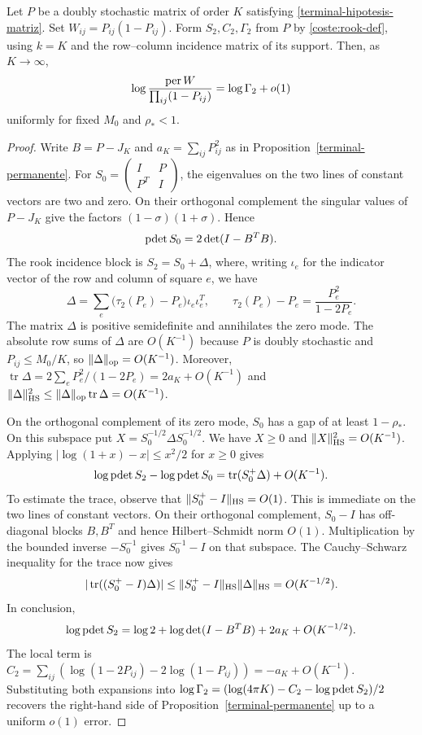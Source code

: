 \begin{lema}\label{terminal-normalizador}
Let $P$ be a doubly stochastic matrix of order $K$ satisfying \eqref{terminal-hipotesis-matriz}.
Set $W_{ij}=P_{ij}(1-P_{ij})$. Form $S_2,C_2,\Gamma_2$ from $P$ by \eqref{coste:rook-def},
using $k=K$ and the row--column incidence matrix of its support. Then, as $K\to\infty$,
\[
 \log\frac{\operatorname{per} W}{\prod_{ij}(1-P_{ij})}=\log\Gamma_2+o(1)
\]
uniformly for fixed $M_0$ and $\rho_*<1$.
\end{lema}
\begin{proof}
Write $B=P-J_K$ and $a_K=\sum_{ij}P_{ij}^2$ as in Proposition~\ref{terminal-permanente}.
For $S_0=\left(\begin{smallmatrix}I&P\\P^T&I\end{smallmatrix}\right)$, the eigenvalues on the
two lines of constant vectors are two and zero. On their orthogonal complement the singular values
of $P-J_K$ give the factors $(1-\sigma)(1+\sigma)$. Hence
\[
 \operatorname{pdet} S_0=2\det(I-B^TB).
\]
The rook incidence block is $S_2=S_0+\Delta$, where, writing $\iota_e$ for the indicator vector
of the row and column of square $e$, we have
\[
 \Delta=\sum_e\bigl(\tau_2(P_e)-P_e\bigr)\iota_e\iota_e^T,\qquad
 \tau_2(P_e)-P_e=\frac{P_e^2}{1-2P_e}.
\]
The matrix $\Delta$ is positive semidefinite and annihilates the zero mode. The absolute row sums
of $\Delta$ are $O(K^{-1})$ because $P$ is doubly stochastic and $P_{ij}\le M_0/K$, so
$\|\Delta\|_{\rm op}=O(K^{-1})$. Moreover,
$\operatorname{tr}\Delta=2\sum_e P_e^2/(1-2P_e)=2a_K+O(K^{-1})$ and
$\|\Delta\|_{\rm HS}^2\le\|\Delta\|_{\rm op}\operatorname{tr}\Delta=O(K^{-1})$.

On the orthogonal complement of its zero mode, $S_0$ has a gap of at least $1-\rho_*$. On this
subspace put $X=S_0^{-1/2}\Delta S_0^{-1/2}$. We have $X\ge0$ and $\|X\|_{\rm HS}^2=O(K^{-1})$.
Applying $|\log(1+x)-x|\le x^2/2$ for $x\ge0$ gives
\[
 \log\operatorname{pdet} S_2-\log\operatorname{pdet} S_0
 =\operatorname{tr}(S_0^+\Delta)+O(K^{-1}).
\]
To estimate the trace, observe that $\|S_0^+-I\|_{\rm HS}=O(1)$. This is immediate on the
two lines of constant vectors. On their orthogonal complement, $S_0-I$ has off-diagonal blocks
$B,B^T$ and hence Hilbert--Schmidt norm $O(1)$. Multiplication by the bounded inverse $-S_0^{-1}$
gives $S_0^{-1}-I$ on that subspace. The Cauchy--Schwarz inequality for the trace now gives
\[
 |\operatorname{tr}((S_0^+-I)\Delta)|\le
 \|S_0^+-I\|_{\rm HS}\|\Delta\|_{\rm HS}=O(K^{-1/2}).
\]
In conclusion,
\[
 \log\operatorname{pdet} S_2=\log 2+\log\det(I-B^TB)+2a_K+O(K^{-1/2}).
\]
The local term is
$C_2=\sum_{ij}(\log(1-2P_{ij})-2\log(1-P_{ij}))=-a_K+O(K^{-1})$.
Substituting both expansions into
$\log\Gamma_2=(\log(4\pi K)-C_2-\log\operatorname{pdet} S_2)/2$
recovers the right-hand side of Proposition~\ref{terminal-permanente} up to a uniform $o(1)$ error.
\end{proof}

